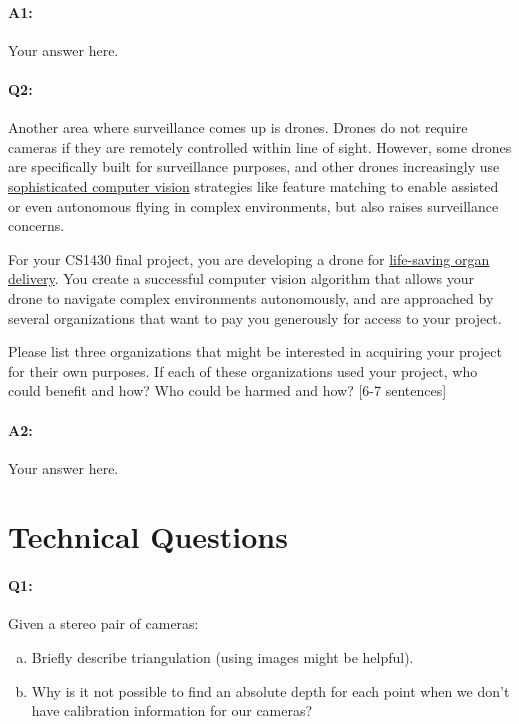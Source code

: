 \paragraph{A1:} Your answer here.
\pagebreak
\paragraph{Q2:} Another area where surveillance comes up is drones. Drones do not require cameras if they are remotely controlled within line of sight. However, some drones are specifically built for surveillance purposes, and other drones increasingly use \href{https://link.springer.com/article/10.1007/s10846-017-0483-z}{sophisticated computer vision} strategies like feature matching to enable assisted or even autonomous flying in complex environments, but also raises surveillance concerns. 

For your CS1430 final project, you are developing a drone for \href{https://www.cnn.com/2019/05/01/health/drone-organ-transplant-bn-trnd/index.html}{life-saving organ delivery}. You create a successful computer vision algorithm that allows your drone to navigate complex environments autonomously, and are approached by several organizations that want to pay you generously for access to your project.

Please list three organizations that might be interested in acquiring your project for their own purposes. If each of these organizations used your project, who could benefit and how? Who could be harmed and how? [6-7 sentences]


\paragraph{A2:} Your answer here.
\pagebreak
\section*{Technical Questions}
\paragraph{Q1:} Given a stereo pair of cameras:
\begin{enumerate} [(a)]
\item Briefly describe triangulation (using images might be helpful).
\item Why is it not possible to find an absolute depth for each point when we don't have calibration information for our cameras?
\end{enumerate}

